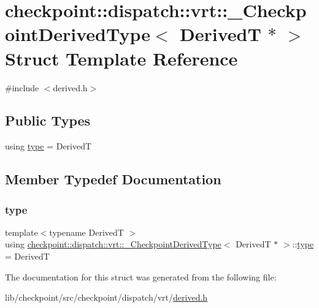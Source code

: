\hypertarget{structcheckpoint_1_1dispatch_1_1vrt_1_1___checkpoint_derived_type_3_01_derived_t_01_5_01_4}{}\section{checkpoint\+:\+:dispatch\+:\+:vrt\+:\+:\+\_\+\+Checkpoint\+Derived\+Type$<$ DerivedT $\ast$ $>$ Struct Template Reference}
\label{structcheckpoint_1_1dispatch_1_1vrt_1_1___checkpoint_derived_type_3_01_derived_t_01_5_01_4}


{\ttfamily \#include $<$derived.\+h$>$}

\subsection*{Public Types}
\begin{DoxyCompactItemize}
\item 
using \hyperlink{structcheckpoint_1_1dispatch_1_1vrt_1_1___checkpoint_derived_type_3_01_derived_t_01_5_01_4_a39524d540288f8ef97b8982e8c17d5bc}{type} = DerivedT
\end{DoxyCompactItemize}


\subsection{Member Typedef Documentation}
\mbox{\label{structcheckpoint_1_1dispatch_1_1vrt_1_1___checkpoint_derived_type_3_01_derived_t_01_5_01_4_a39524d540288f8ef97b8982e8c17d5bc}} 
\subsubsection{\texorpdfstring{type}{type}}
{\footnotesize\ttfamily template$<$typename DerivedT $>$ \\
using \hyperlink{structcheckpoint_1_1dispatch_1_1vrt_1_1___checkpoint_derived_type}{checkpoint\+::dispatch\+::vrt\+::\+\_\+\+Checkpoint\+Derived\+Type}$<$ DerivedT $\ast$ $>$\+::\hyperlink{structcheckpoint_1_1dispatch_1_1vrt_1_1___checkpoint_derived_type_3_01_derived_t_01_5_01_4_a39524d540288f8ef97b8982e8c17d5bc}{type} =  DerivedT}



The documentation for this struct was generated from the following file\+:\begin{DoxyCompactItemize}
\item 
lib/checkpoint/src/checkpoint/dispatch/vrt/\hyperlink{derived_8h}{derived.\+h}\end{DoxyCompactItemize}
